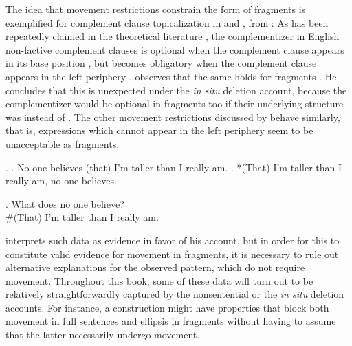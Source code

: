 The idea that movement restrictions constrain the form of fragments is exemplified for complement clause topicalization in \Next and \NNext, from \citet[690]{merchant2004}: As has been repeatedly claimed in the theoretical literature \citep[see e.g.][]{morgan1973, chomsky1981, stowell1981, webelhuth1992}, the complementizer in English non-factive complement clauses is optional when the complement clause appears in its base position \Next[a], but becomes obligatory when the complement clause appears in the left-periphery \Next[b]. \citet{merchant2004} observes that the same holds for fragments \NNext. He concludes that this is unexpected under the \textit{in situ} deletion account, because the complementizer would be optional in fragments too if their underlying structure was \Next[a] instead of \Next[b]. The other movement restrictions discussed by \citet{merchant2004} behave similarly, that is, expressions which cannot appear in the left periphery seem to be unacceptable as fragments. 

\ex. \label{ex:merchant.teacher-sent}
\a. No one believes (that) I’m taller than I really am. 
\b. *(That) I’m taller than I really am, no one believes.

\ex. \label{ex:merchant.teacher-frag}
What does no one believe? \hfill \citep[690]{merchant2004}\\
\mbox{}\hspace{-.45em}\#(That) I’m taller than I really am.

\newpage
\noindent \citet{merchant2004} interprets such data as evidence in favor of his account, but in order for this to constitute valid evidence for movement in fragments, it is necessary to rule out alternative explanations for the observed pattern, which do not require movement. Throughout this book, some of these data will turn out to be relatively straightforwardly captured by the nonsentential or the \textit{in situ} deletion accounts. For instance, a construction might have properties that block both movement in full sentences and ellipsis in fragments without having to assume that the latter necessarily undergo movement.

